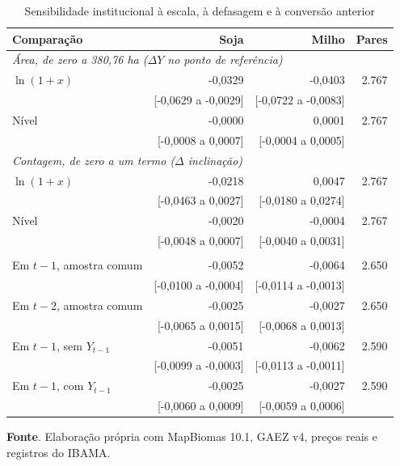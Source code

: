 \begin{table}[htbp]
\centering
\footnotesize
\setlength{\tabcolsep}{4pt}
\captionstyle{\centering}
\normalcaption
\caption{Sensibilidade institucional à escala, à defasagem e à conversão anterior}
\label{tab:ap-h1b-testes-quali}
\begin{tabular}{lrrr}
\toprule
Comparação & Soja & Milho & Pares \\
\midrule
\multicolumn{4}{l}{\textit{Área, de zero a 380,76 ha ($\Delta Y$ no ponto de referência)}} \\
$\ln(1+x)$ & -0,0329 & -0,0403 & 2.767 \\
 & [-0,0629 a -0,0029] & [-0,0722 a -0,0083] &  \\
Nível & -0,0000 & 0,0001 & 2.767 \\
 & [-0,0008 a 0,0007] & [-0,0004 a 0,0005] &  \\
\multicolumn{4}{l}{\textit{Contagem, de zero a um termo ($\Delta$ inclinação)}} \\
$\ln(1+x)$ & -0,0218 & 0,0047 & 2.767 \\
 & [-0,0463 a 0,0027] & [-0,0180 a 0,0274] &  \\
Nível & -0,0020 & -0,0004 & 2.767 \\
 & [-0,0048 a 0,0007] & [-0,0040 a 0,0031] &  \\
\addlinespace
\multicolumn{4}{l}{\textit{Área de novos embargos, coeficiente de $\ln(1+\text{ha})$}} \\
Em $t-1$, amostra comum & -0,0052 & -0,0064 & 2.650 \\
 & [-0,0100 a -0,0004] & [-0,0114 a -0,0013] &  \\
Em $t-2$, amostra comum & -0,0025 & -0,0027 & 2.650 \\
 & [-0,0065 a 0,0015] & [-0,0068 a 0,0013] &  \\
Em $t-1$, sem $Y_{t-1}$ & -0,0051 & -0,0062 & 2.590 \\
 & [-0,0099 a -0,0003] & [-0,0113 a -0,0011] &  \\
Em $t-1$, com $Y_{t-1}$ & -0,0025 & -0,0027 & 2.590 \\
 & [-0,0060 a 0,0009] & [-0,0059 a 0,0006] &  \\
\bottomrule
\end{tabular}
\par\smallskip\begin{minipage}{\textwidth}\footnotesize
\SingleSpacing
\noindent\textbf{Fonte}. Elaboração própria com MapBiomas 10.1, GAEZ v4, preços reais e registros do IBAMA.
\end{minipage}
\end{table}
